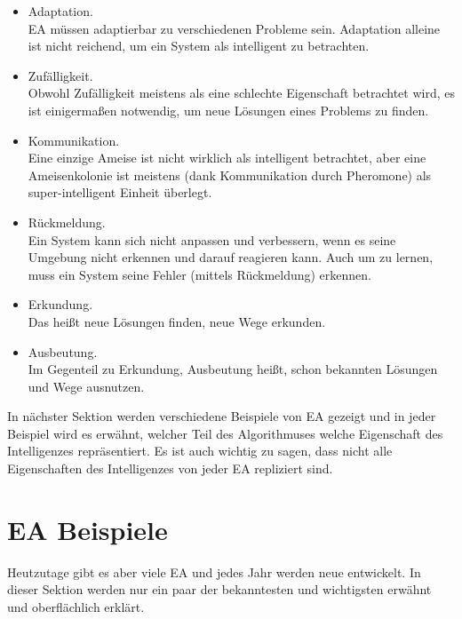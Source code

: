 \documentclass[twoside,twocolumn]{article}
\begin{document}
\begin{itemize}
\item{Adaptation.}\\
EA müssen adaptierbar zu verschiedenen Probleme sein. Adaptation alleine ist nicht reichend, um ein System als intelligent zu betrachten.\\
\item{Zufälligkeit.}\\
Obwohl Zufälligkeit meistens als eine schlechte Eigenschaft betrachtet wird, es ist einigermaßen notwendig, um neue Lösungen eines Problems zu finden.\\
\item{Kommunikation.}\\
Eine einzige Ameise ist nicht wirklich als intelligent betrachtet, aber eine Ameisenkolonie ist meistens (dank Kommunikation durch Pheromone) als super-intelligent Einheit überlegt.\\
\item{Rückmeldung.}\\
Ein System kann sich nicht anpassen und verbessern, wenn es seine Umgebung nicht erkennen und darauf reagieren kann. Auch um zu lernen, muss ein System seine Fehler (mittels Rückmeldung) erkennen.\\
\item{Erkundung.}\\
Das heißt neue Lösungen finden, neue Wege erkunden.\\
\item{Ausbeutung.}\\
Im Gegenteil zu Erkundung, Ausbeutung heißt, schon bekannten Lösungen und Wege ausnutzen.
\end{itemize}

In nächster Sektion werden verschiedene Beispiele von EA gezeigt und in jeder Beispiel wird es erwähnt, welcher Teil des Algorithmuses welche Eigenschaft des Intelligenzes repräsentiert. Es ist auch wichtig zu sagen, dass nicht alle Eigenschaften des Intelligenzes von jeder EA repliziert sind.


\section{EA Beispiele}

Heutzutage gibt es aber viele EA und jedes Jahr werden neue entwickelt. In dieser Sektion werden nur ein paar der bekanntesten und wichtigsten erwähnt und oberflächlich erklärt.
\end{document}
